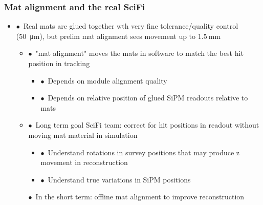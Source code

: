\documentclass[aspectratio=1610, 12pt, xcolor=dvipsnames]{beamer}
\begin{document}

\begin{frame}\frametitle{Mat alignment and the real SciFi}
  \begin{itemize}
    \item $\bullet$\, Real mats are glued together wth very fine tolerance/quality control (\approx \SI{50}{\micro\m}), but prelim mat alignment sees movement up to $\SI{1.5}{\milli\m}$
    \begin{itemize}
      \item $\bullet$\, "mat alignment" moves the mats in software to match the best hit position in tracking
      \begin{itemize}
        \item $\bullet$\, Depends on module alignment quality
        \item $\bullet$\, Depends on relative position of glued SiPM readouts relative to mats
      \end{itemize}
      \item $\bullet$\, Long term goal SciFi team: correct for hit positions in readout without moving mat material in simulation
      \begin{itemize}
        \item $\bullet$\, Understand rotations in survey positions that may produce z movement in reconstruction
        \item $\bullet$\, Understand true variations in SiPM positions
      \end{itemize}
      $\bullet$\, In the short term: offline mat alignment to improve reconstruction
    \end{itemize}
  \end{itemize}
\end{frame}
\end{document}
